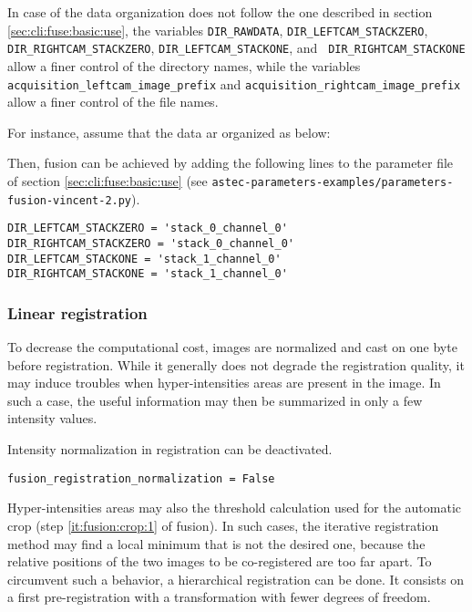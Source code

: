 In case of the data organization does not follow the one described in section \ref{sec:cli:fuse:basic:use}, the variables
\verb|DIR_RAWDATA|, \verb|DIR_LEFTCAM_STACKZERO|,  \verb|DIR_RIGHTCAM_STACKZERO|, \verb|DIR_LEFTCAM_STACKONE|, and \verb| DIR_RIGHTCAM_STACKONE| allow a finer control of the directory names, while the variables
\verb|acquisition_leftcam_image_prefix| and 
\verb|acquisition_rightcam_image_prefix| allow a finer control of the file names.

For instance, assume that the data ar organized as below:

Then, fusion can be achieved by adding the following lines to the parameter file of section \ref{sec:cli:fuse:basic:use}  (see \texttt{astec-parameters-examples/parameters-fusion-vincent-2.py}).

\begin{verbatim}
DIR_LEFTCAM_STACKZERO = 'stack_0_channel_0'
DIR_RIGHTCAM_STACKZERO = 'stack_0_channel_0'
DIR_LEFTCAM_STACKONE = 'stack_1_channel_0'
DIR_RIGHTCAM_STACKONE = 'stack_1_channel_0'
\end{verbatim}

\subsubsection{Linear registration}

To decrease the computational cost, images are normalized and cast on one byte before registration. While it generally does not degrade the registration quality, it may induce troubles when hyper-intensities areas are present in the image. In such a case, the useful information may then be summarized in only a few intensity values.

Intensity normalization in registration can be deactivated.
\begin{verbatim}
fusion_registration_normalization = False
\end{verbatim}

Hyper-intensities areas may also the threshold calculation used for the automatic crop (step \ref{it:fusion:crop:1} of fusion). In such cases, the iterative registration method may find a local minimum that is not the desired one, because the relative positions of the two images to be co-registered are too far apart. To circumvent such a behavior, a hierarchical registration can be done. It consists on a first pre-registration with a transformation with fewer degrees of freedom. 

